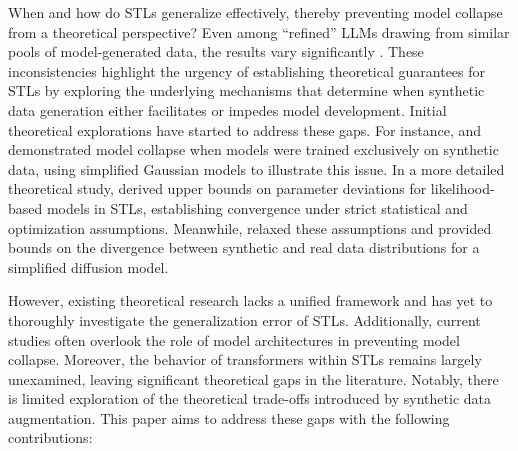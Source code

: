 When and how do STLs generalize effectively, thereby preventing model collapse from a theoretical perspective? Even among “refined” LLMs drawing from similar pools of model-generated data, the results vary significantly \citep{briesch2023large,fu2024championing}. These inconsistencies highlight the urgency of establishing theoretical guarantees for STLs by exploring the underlying mechanisms that determine when synthetic data generation either facilitates or impedes model development. Initial theoretical explorations have started to address these gaps. For instance, \cite{shumailov2024ai} and \cite{alemohammadself} demonstrated model collapse when models were trained exclusively on synthetic data, using simplified Gaussian models to illustrate this issue. In a more detailed theoretical study, \cite{bertrandstability} derived upper bounds on parameter deviations for likelihood-based models in STLs, establishing convergence under strict statistical and optimization assumptions. Meanwhile, \cite{futowards} relaxed these assumptions and provided bounds on the divergence between synthetic and real data distributions for a simplified diffusion model.



However, existing theoretical research lacks a unified framework and has yet to thoroughly investigate the generalization error of STLs. Additionally, current studies often overlook the role of model architectures in preventing model collapse. Moreover, the behavior of transformers within STLs remains largely unexamined, leaving significant theoretical gaps in the literature. Notably, there is limited exploration of the theoretical trade-offs introduced by synthetic data augmentation. This paper aims to address these gaps with the following contributions:

